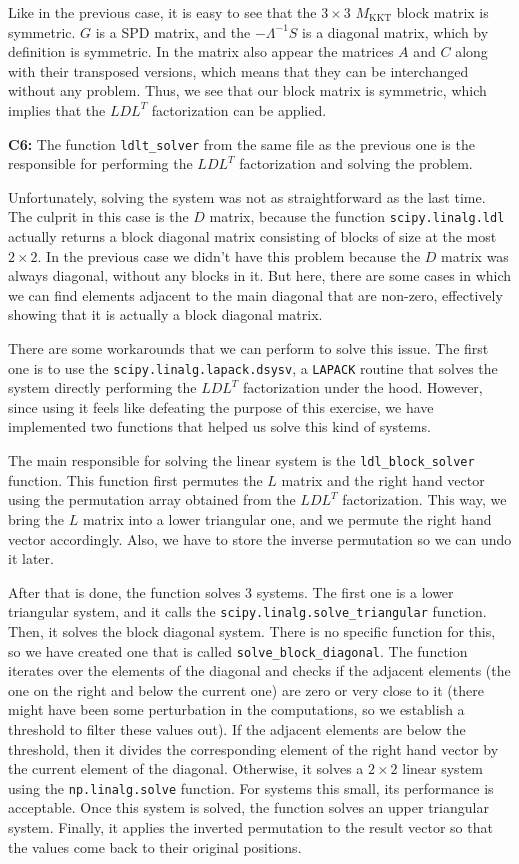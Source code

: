 \documentclass[11pt,a4paper]{article}
\begin{document}
Like in the previous case, it is easy to see that the $3 \times 3$ $M_\text{KKT}$ block
matrix is symmetric. $G$ is a SPD matrix, and the $-\Lambda^{-1}S$ is a diagonal matrix,
which by definition is symmetric. In the matrix also appear the matrices $A$ and $C$ along
with their transposed versions, which means that they can be interchanged without any
problem. Thus, we see that our block matrix is symmetric, which implies that the $LDL^T$
factorization can be applied.

\noindent \textbf{C6:} The function \texttt{ldlt\_solver} from the same file as the previous
one is the responsible for performing the $LDL^T$ factorization and solving the problem.

Unfortunately, solving the system was not as straightforward as the last time. The culprit in this
case is the $D$ matrix, because the function \texttt{scipy.linalg.ldl} actually returns a block
diagonal matrix consisting of blocks of size at the most $2 \times 2$. In the previous case
we didn't have this problem because the $D$ matrix was always diagonal, without any blocks in it.
But here, there are some cases in which we can find elements adjacent to the main diagonal
that are non-zero, effectively showing that it is actually a block diagonal matrix.

There are some workarounds that we can perform to solve this issue. The first one is
to use the \texttt{scipy.linalg.lapack.dsysv}, a \texttt{LAPACK} routine that solves the system
directly performing the $LDL^T$ factorization under the hood. However, since using it feels like
defeating the purpose of this exercise, we have implemented two functions that helped us solve
this kind of systems.

The main responsible for solving the linear system is the \texttt{ldl\_block\_solver} function.
This function first permutes the $L$ matrix and the right hand vector using the permutation array
obtained from the $LDL^T$ factorization. This way, we bring the $L$ matrix into a lower triangular
one, and we permute the right hand vector accordingly. Also, we have to store the inverse permutation
so we can undo it later.

After that is done, the function solves 3 systems. The first one is a lower triangular system,
and it calls the \texttt{scipy.linalg.solve\_triangular} function. Then, it solves the
block diagonal system. There is no specific function for this, so we have created one that
is called \texttt{solve\_block\_diagonal}. The function iterates over the elements of the diagonal
and checks if the adjacent elements (the one on the right and below the current one) are zero or very
close to it (there might have been some perturbation in the computations, so we establish a threshold
to filter these values out). If the adjacent elements are below the threshold, then it divides the
corresponding element of the right hand vector by the current element of the diagonal. Otherwise, it
solves a $2 \times 2$ linear system using the \texttt{np.linalg.solve} function. For systems this small,
its performance is acceptable. Once this system is solved, the function solves an upper triangular
system. Finally, it applies the inverted permutation to the result vector so that the values come
back to their original positions.
\end{document}
